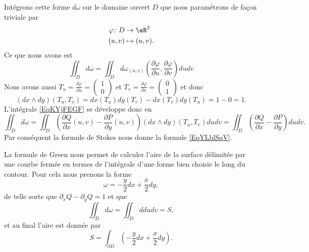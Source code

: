 Intégrons cette forme \( d\omega\) sur le domaine ouvert \( D\) que nous paramétrons de façon triviale par
\begin{equation}
	\begin{aligned}
		\varphi\colon D & \to \eR^2      \\
		(u,v)           & \mapsto (u,v).
	\end{aligned}
\end{equation}
Ce que nous avons est
\begin{equation}\label{EqKYjFEGF}
	\iint_D d\omega=\iint_D d\omega_{(u,v)}\left( \frac{ \partial \varphi }{ \partial u },\frac{ \partial \varphi }{ \partial v } \right)dudv
\end{equation}
Nous avons aussi \( T_u=\frac{ \partial \varphi }{ \partial u }=\begin{pmatrix}
	1 \\
	0
\end{pmatrix}\) et \(T_v= \frac{ \partial \varphi }{ \partial v }=\begin{pmatrix}
	0 \\
	1
\end{pmatrix}\) et donc
\begin{equation}
	(dx\wedge dy)(T_u,T_v)=dx(T_u)dy(T_v)-dx(T_v)dy(T_u)=1-0=1.
\end{equation}
L'intégrale \eqref{EqKYjFEGF} se développe donc en
\begin{equation}
	\iint_Dd\omega=\iint_D\left( \frac{ \partial Q }{ \partial x }(u,v)-\frac{ \partial P }{ \partial y }(u,v) \right)(dx\wedge dy)(T_u,T_v)dudv=\iint_D\left( \frac{ \partial Q }{ \partial x }-\frac{ \partial P }{ \partial y } \right)dudv.
\end{equation}
Par conséquent la formule de Stokes nous donne la formule \eqref{EqYLblSqV}.

La formule de Green nous permet de calculer l'aire de la surface délimitée par une courbe fermée en termes de l'intégrale d'une forme bien choisie le long du contour. Pour cela nous prenons la forme
\begin{equation}    \label{EqZNXYMQb}
	\omega=-\frac{ y }{2}dx+\frac{ x }{2}dy,
\end{equation}
de telle sorte que \( \partial_xQ-\partial_yQ=1\) et que
\begin{equation}
	\iint_Dd\omega=\iint_Dddudv=S,
\end{equation}
et au final l'aire est donnée par
\begin{equation}
	S=\int_{\partial D}\left( -\frac{ y }{2}dx+\frac{ x }{2}dy \right).
\end{equation}


